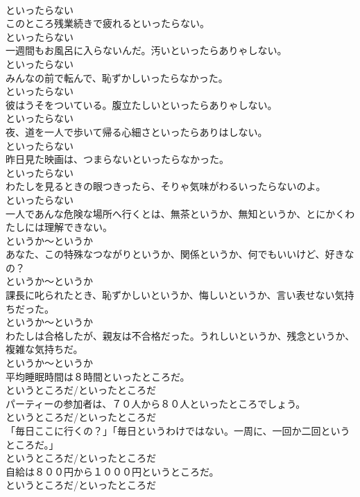 \documentclass[8pt]{extreport}
\begin{document}
\begin{CJK}{UTF8}{min}
\\	といったらない
\\	このところ残業続きで疲れるといったらない。	
\\	といったらない
\\	一週間もお風呂に入らないんだ。汚いといったらありゃしない。	
\\	といったらない
\\	みんなの前で転んで、恥ずかしいったらなかった。	
\\	といったらない
\\	彼はうそをついている。腹立たしいといったらありゃしない。	
\\	といったらない
\\	夜、道を一人で歩いて帰る心細さといったらありはしない。	
\\	といったらない
\\	昨日見た映画は、つまらないといったらなかった。	
\\	といったらない
\\	わたしを見るときの眼つきったら、そりゃ気味がわるいったらないのよ。	
\\	といったらない
\\	一人であんな危険な場所へ行くとは、無茶というか、無知というか、とにかくわたしには理解できない。	
\\	というか～というか
\\	あなた、この特殊なつながりというか、関係というか、何でもいいけど、好きなの？	
\\	というか～というか
\\	課長に叱られたとき、恥ずかしいというか、悔しいというか、言い表せない気持ちだった。	
\\	というか～というか
\\	わたしは合格したが、親友は不合格だった。うれしいというか、残念というか、複雑な気持ちだ。	
\\	というか～というか
\\	平均睡眠時間は８時間といったところだ。	
\\	というところだ/といったところだ
\\	パーティーの参加者は、７０人から８０人といったところでしょう。	
\\	というところだ/といったところだ
\\	「毎日ここに行くの？」「毎日というわけではない。一周に、一回か二回というところだ。」	
\\	というところだ/といったところだ
\\	自給は８００円から１０００円というところだ。	
\\	というところだ/といったところだ

\end{CJK}
\end{document}
